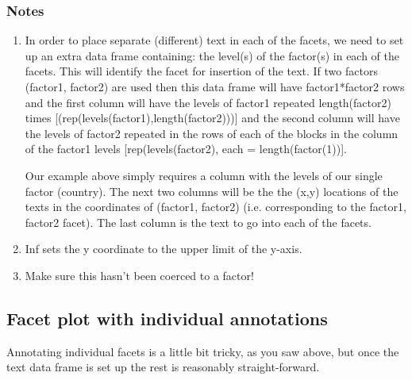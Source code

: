 \documentclass[titlepage]{book}\usepackage{knitr}
\begin{document}
\subsubsection{Notes}
\begin{enumerate}
\item{In order to place separate (different) text in each of the facets, we need to set up an extra data frame containing: the level(s) of the factor(s) in each of the facets. This will identify the facet for insertion of the text. If two factors (factor1, factor2) are used then this data frame will have factor1*factor2 rows and the first column will have the levels of factor1 repeated length(factor2) times [(rep(levels(factor1),length(factor2)))] and the second column will have the levels of factor2 repeated in the rows of each of the blocks in the column of the factor1 levels [rep(levels(factor2), each = length(factor(1))].

Our example above simply requires a column with the levels of our single factor (country). The next two columns will be the the (x,y) locations of the texts in the  coordinates of (factor1, factor2) (i.e. corresponding to the factor1, factor2 facet).  The last column is the text to go into each of the facets.}
\item{Inf sets the y coordinate to the upper limit of the y-axis.}
\item{ Make sure this hasn't been coerced to a factor!}

\end{enumerate}

\subsection{Facet plot with individual annotations}
Annotating individual facets is a little bit tricky, as you saw above, but once the text data frame is set up the rest is reasonably straight-forward.

\begin{knitrout}
\color{fgcolor}\begin{kframe}
\begin{alltt}
 \hlkwb{<-} \hlstd{(} 
            \hlstd{(}                        
 \hlkwb{<-}  \hlopt{+} \hlstd{()} \hlopt{+}  \hlopt{~}   \hlstd{=} \hlstd{)}           
 \hlopt{+} \hlstd{(}  \hlstd{(}   \hlstd{=} \hlstd{,}               
               \hlstd{=}\hlstd{,}  \hlstd{=} \hlstd{)}
\end{alltt}
\end{kframe}
\end{knitrout}
\end{document}
